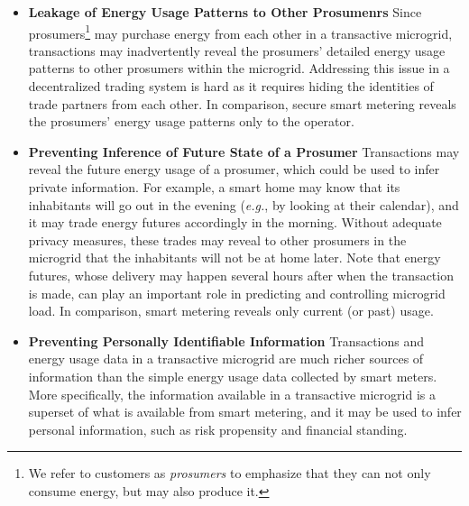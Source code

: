\begin{itemize}[itemsep=0.25\parskip,topsep=-0.5\parskip]
\item \textbf{Leakage of Energy Usage Patterns to Other Prosumenrs} 
 Since prosumers\footnote{We
  refer to customers as \emph{prosumers} to emphasize that they can
  not only consume energy, but may also produce it.} may purchase
  energy from each other in a transactive microgrid, transactions may
  inadvertently reveal the prosumers' detailed energy usage patterns
  to other prosumers within the microgrid.  Addressing this issue in a
  decentralized trading system is hard as it requires hiding the
  identities of trade partners from each other. In comparison, secure
  smart metering reveals the prosumers' energy usage patterns only to
  the operator.

\item \textbf{Preventing Inference of Future State of a Prosumer} 
   Transactions may reveal
  the future energy usage of a prosumer, which could be used to infer
  private information.  For example, a smart home may know that its
  inhabitants will go out in the evening (\emph{e.g.}, by looking at
  their calendar), and it may trade energy futures accordingly in the
  morning.  Without adequate privacy measures, these trades may reveal
  to other prosumers in the microgrid that the inhabitants will not be
  at home later.  Note that energy
  futures, whose delivery may happen several hours after when the
  transaction is made, can play an important role in predicting and
  controlling microgrid load.  In comparison, smart metering reveals
  only current (or past) usage.

\item \textbf{Preventing Personally Identifiable Information} 
  Transactions and energy
  usage data in a transactive microgrid are much richer sources of
  information than the simple energy usage data collected by smart
  meters.  More specifically, the information available in a
  transactive microgrid is a superset of what is available from smart
  metering, and it may be used to infer personal information, such as
  risk propensity and financial standing.
\end{itemize}
\vspace{0.5\parskip}

